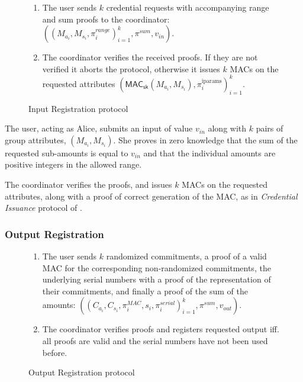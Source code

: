\documentclass{article}
\begin{document}
\begin{figure}[h!]
    \begin{mdframed}
    \begin{enumerate}
        \item The user sends $k$ credential requests with accompanying range and sum proofs to the coordinator:  $((M_{a_i},M_{s_i},\pi^{\textit{range}}_{i})^{k}_{i=1},\pi^{sum},v_{\textit{in}})$.
        \item The coordinator verifies the received proofs. If they are not verified it aborts the protocol, otherwise it issues $k$ MACs on the requested attributes $(\mathsf{MAC}_\mathsf{sk}(M_{a_i},M_{s_i}), \pi_i^{\mathrm{iparams}})^{k}_{i=1}$.
    \end{enumerate}

\end{mdframed}
    \caption{Input Registration protocol}
    \label{fig:inputreg}
\end{figure}

The user, acting as Alice, submits an input of value $v_{\mathit{in}}$ along with $k$ pairs of group attributes,
$(M_{a_i}, M_{s_i})$.
She proves in zero knowledge that the sum of the requested sub-amounts is equal to $v_{\mathit{in}}$ and that the individual amounts are positive integers in the allowed range.

The coordinator verifies the proofs, and issues $k$ MACs on the requested attributes, along with a proof of correct generation of the MAC, as in \textit{Credential Issuance} protocol of \cite{chase2019signal}.

\subsubsection{Output Registration}

\begin{figure}[h!]
    \begin{mdframed}
    \begin{enumerate}
        \item The user sends $k$ randomized commitments, a proof of a valid MAC for the corresponding non-randomized commitments, the underlying serial numbers with a proof of the representation of their commitments, and finally a proof of the sum of the amounts:   $((C_{a_i},C_{s_i},\pi_{i}^{\textit{MAC}},s_i, \pi_i^{\textit{serial}})^{k}_{i=1}, \pi^{\textit{sum}}, v_{\textit{out}})$.
        \item The coordinator verifies proofs and registers requested output iff. all proofs are valid and the serial numbers have not been used before.
    \end{enumerate}
\end{mdframed}
    \caption{Output Registration protocol}
    \label{fig:outputreg}
\end{figure}
\end{document}
